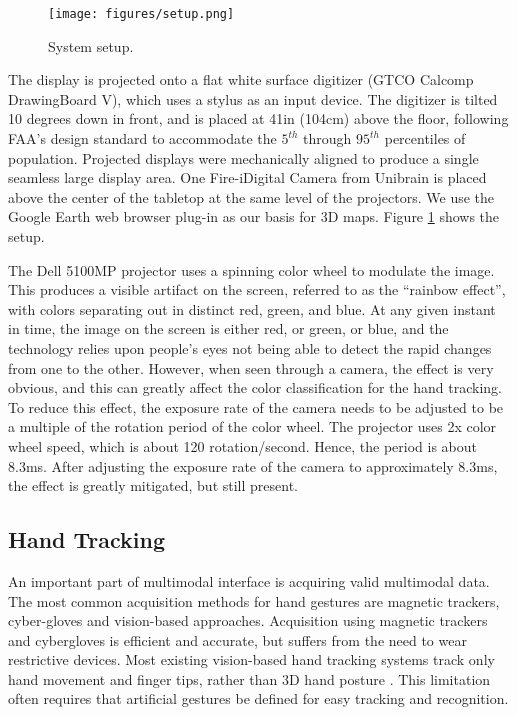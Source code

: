 \begin{figure}
	\centering
	\texttt{[image: figures/setup.png]} 
	\caption{System setup.} \label{fig:setup}
\end{figure}

The display is projected onto a flat white surface digitizer (GTCO Calcomp DrawingBoard V), which uses a stylus as an input device. The digitizer is tilted 10 degrees down in front, and is placed at 41in (104cm) above the floor, following FAA's design standard to accommodate the $5^{th}$ through $95^{th}$ percentiles of population. Projected displays were mechanically aligned to produce a single seamless large display area. One Fire-i\texttrademark Digital Camera from Unibrain is placed above the center of the tabletop at the same level of the projectors. We use the Google Earth web browser plug-in as our basis for 3D maps. Figure \ref{fig:setup} shows the setup.

The Dell 5100MP projector uses a spinning color wheel to modulate the image. This produces a visible artifact on the screen, referred to as the ``rainbow effect'', with colors separating out in distinct red, green, and blue. At any given instant in time, the image on the screen is either red, or green, or blue, and the technology relies upon people's eyes not being able to detect the rapid changes from one to the other. However, when seen through a camera, the effect is very obvious, and this can greatly affect the color classification for the hand tracking. To reduce this effect, the exposure rate of the camera needs to be adjusted to be a multiple of the rotation period of the color wheel. The projector uses 2x color wheel speed, which is about 120 rotation/second. Hence, the period is about 8.3ms. After adjusting the exposure rate of the camera to approximately 8.3ms, the effect is greatly mitigated, but still present. 

\subsection{Hand Tracking}
An important part of multimodal interface is acquiring valid multimodal data. The most common acquisition methods for hand gestures are magnetic trackers, cyber-gloves and vision-based approaches. Acquisition using magnetic trackers and cybergloves is efficient and accurate, but suffers from the need to wear restrictive devices. Most existing vision-based hand tracking systems track only hand movement and finger tips, rather than 3D hand posture \cite{Demirdjian03}\cite{Oka02}\cite{Rauschert02}. This limitation often requires that artificial gestures be defined for easy tracking and recognition.  

